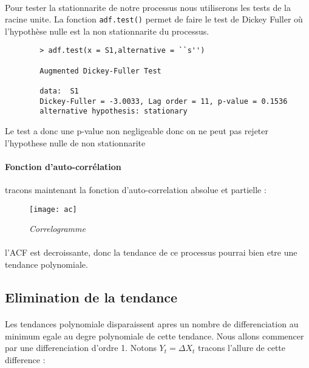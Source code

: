         \paragraph{} Pour tester la stationnarite de notre processus nous utiliserons les tests
        de la racine unite. 
        La fonction \verb+adf.test()+ permet de faire le test de Dickey Fuller
        où l'hypothèse nulle est la non stationnarite du processus.  
        \begin{verbatim}
        > adf.test(x = S1,alternative = ``s'')

        Augmented Dickey-Fuller Test

        data:  S1
        Dickey-Fuller = -3.0033, Lag order = 11, p-value = 0.1536
        alternative hypothesis: stationary
        \end{verbatim}

        Le test a donc une p-value non negligeable donc on ne peut pas rejeter
        l'hypothese nulle de non stationnarite 
        
        \paragraph{Fonction d'auto-corrélation} tracons maintenant la fonction
        d'auto-correlation absolue et partielle :
        \begin{figure}[H]
            \centering 
            \label{fig:ac} 
            \texttt{[image: ac]} 
            \caption{\it Correlogramme } 
        \end{figure} 

        \paragraph{}l'ACF est decroissante, donc la tendance de ce processus
        pourrai bien etre une tendance polynomiale. 
        

    \subsection{Elimination de la tendance}
        \paragraph{} Les tendances polynomiale disparaissent apres un nombre de
        differenciation au minimum egale au degre polynomiale de cette tendance.
        Nous allons commencer par une differenciation d'ordre 1. Notons $Y_t=\Delta X_t$
        tracons l'allure de cette difference :

